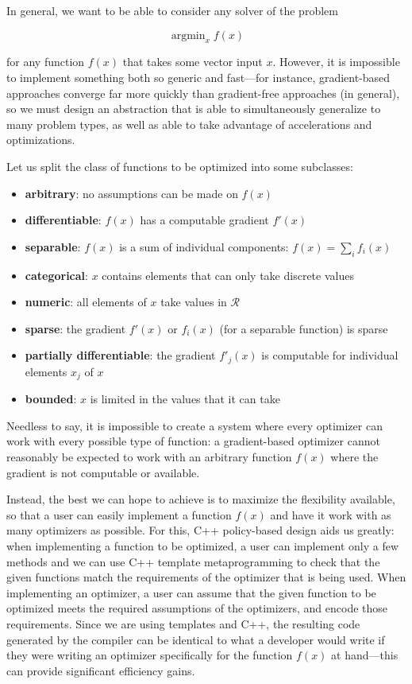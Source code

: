 \documentclass{article}
\begin{document}
In general, we want to be able to consider any solver of the problem

\begin{equation}
\operatorname{argmin}_{x} f(x)
\end{equation}

\noindent for any function $f(x)$ that takes some vector input $x$.  However, it
is impossible to implement something both so generic and fast---for instance,
gradient-based approaches converge far more quickly than gradient-free
approaches (in general), so we must design an abstraction that is able to
simultaneously generalize to many problem types, as well as able to take
advantage of accelerations and optimizations.

Let us split the class of functions to be optimized into some subclasses:

\begin{itemize}
  \item {\bf arbitrary}: no assumptions can be made on $f(x)$
  \item {\bf differentiable}: $f(x)$ has a computable gradient $f'(x)$
  \item {\bf separable}: $f(x)$ is a sum of individual components: $f(x) =
\sum_{i} f_i(x)$
  \item {\bf categorical}: $x$ contains elements that can only take discrete
values
  \item {\bf numeric}: all elements of $x$ take values in $\mathcal{R}$
  \item {\bf sparse}: the gradient $f'(x)$ or $f_i(x)$ (for a separable
function) is sparse
  \item {\bf partially differentiable}: the gradient $f'_j(x)$ is computable for
individual elements $x_j$ of $x$
  \item {\bf bounded}: $x$ is limited in the values that it can take
\end{itemize}

Needless to say, it is impossible to create a system where every optimizer can
work with every possible type of function: a gradient-based optimizer cannot
reasonably be expected to work with an arbitrary function $f(x)$ where the
gradient is not computable or available.

Instead, the best we can hope to achieve is to maximize the flexibility
available, so that a user can easily implement a function $f(x)$ and have it
work with as many optimizers as possible.  For this, C++ policy-based design
aids us greatly: when implementing a function to be optimized, a user can
implement only a few methods and we can use C++ template metaprogramming to
check that the given functions match the requirements of the optimizer that is
being used.  When implementing an optimizer, a user can assume that the given
function to be optimized meets the required assumptions of the optimizers, and
encode those requirements.
Since we are using templates and C++, the resulting
code generated by the compiler can be identical to what a developer would write
if they were writing an optimizer specifically for the function $f(x)$ at
hand---this can provide significant efficiency gains.
\end{document}
